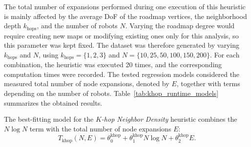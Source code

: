 The total number of expansions performed during one execution of this heuristic is mainly affected
by the average DoF of the roadmap vertices, the neighborhood depth \(k_{\text{hops}}\), and the
number of robots \(N\). Varying the roadmap degree would require creating new maps or modifying
existing ones only for this analysis, so this parameter was kept fixed. The dataset was therefore
generated by varying \(k_{\text{hops}}\) and \(N\), using
\(k_{\text{hops}}=\{1,2,3\}\) and \(N=\{10,25,50,100,150,200\}\). For each combination, the
heuristic was executed 20 times, and the corresponding computation times were recorded.
The tested regression models considered the measured total number of node expansions, denoted
by \(E\), together with terms depending on the number of robots. Table~\ref{tab:khop_runtime_models}
summarizes the obtained results.

\begin{table}[H]
\centering
\caption{Regression models tested for estimating the computation time of the \textit{\(K\)-hop Neighbor Density} heuristic.}
\label{tab:khop_runtime_models}
\small
\renewcommand{\arraystretch}{1.25}
\end{table}

The best-fitting model for the \textit{\(K\)-hop Neighbor Density} heuristic combines the
\(N\log N\) term with the total number of node expansions \(E\):
\begin{equation}
    T_{\mathrm{khop}}(N,E)
    =
    \theta^{\mathrm{khop}}_0
    +
    \theta^{\mathrm{khop}}_1 N\log N
    +
    \theta^{\mathrm{khop}}_2 E .
    \label{eq:khop_runtime_model}
\end{equation}

